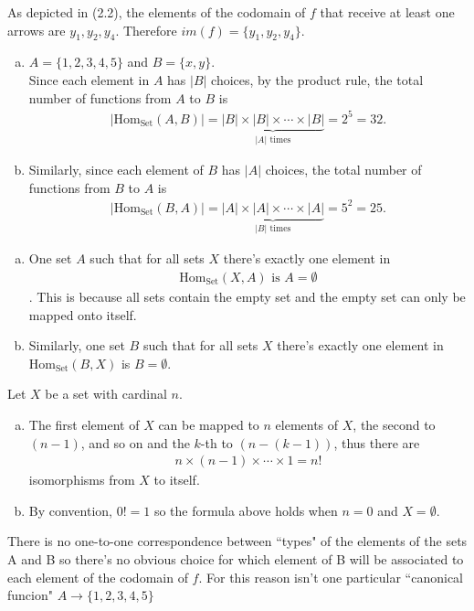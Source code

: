 \documentclass[12pt]{article}
\theoremstyle{remark}
\theoremstyle{definition}
\def\sexc{\begin{enumerate}[a.)]\setlength{\itemsep}{.1cm}\setlength{\parskip}{.1cm}\item}
\def\next{\item}
\def\endsexc{\end{enumerate}}
\begin{document}
\begin{large}
\begin{Exercise}
As depicted in (2.2), the elements of the codomain of $f$ that receive at least one arrows are $y_1,y_2,y_4$. Therefore $im(f)=\{y_1,y_2,y_4\}$.
\end{Exercise}
\begin{Exercise}
\sexc
$A=\{1,2,3,4,5\}$ and $B=\{x,y\}$. \\
Since each element in $A$ has $|B|$ choices, by the product rule, the total number of functions from $A$ to $B$ is \begin{align*}
|\text{Hom}_\text{Set}(A,B)|=\underbrace{|B|\times |B| \times \cdots \times |B|}_{\text{$|A|$ times}} = 2^5 = 32.
\end{align*}
\next Similarly, since each element of $B$ has $|A|$ choices, the total number of functions from $B$ to $A$ is \begin{align*}
|\text{Hom}_\text{Set}(B,A)|=\underbrace{|A|\times |A| \times \cdots \times |A|}_{\text{$|B|$ times}} = 5^2 = 25.
\end{align*}
\endsexc
\end{Exercise}
\begin{Exercise}
\sexc One set $A$ such that for all sets $X$ there's exactly one element in \begin{align*}\text{Hom}_\text{Set}(X,A) \text{\ is \ } A =\emptyset
\end{align*}. 
This is because all sets contain the empty set and the empty set can only be mapped onto itself. 
\next Similarly, one set $B$ such that for all sets $X$ there's exactly one element in $\text{Hom}_\text{Set}(B,X)$ is $B = \emptyset.$
\endsexc
\end{Exercise}
\begin{Exercise}
Let $X$ be a set with cardinal $n$. 
\sexc 
The first element of $X$ can be mapped to $n$ elements of $X$, the second to $(n-1)$, and so on and the $k$-th to $(n-(k-1))$, thus there are 
\begin{align*}
n\times(n-1)\times \cdots \times 1= n!
\end{align*} isomorphisms from $X$ to itself.
\next 
By convention, $0!=1$ so the formula above holds when $n=0$ and $X=\emptyset$.
\endsexc
\end{Exercise}
\begin{Exercise}
There is no one-to-one correspondence between ``types" of the elements of the sets A and B so there's no obvious choice for which element of B will be associated to each element of the codomain of $f$. For this reason isn't one particular ``canonical funcion" $A \rightarrow \{1,2,3,4,5\}$

\end{Exercise}
\end{large}
\end{document}
